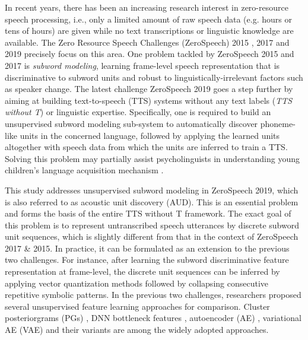 \documentclass[a4paper]{article}
\begin{document}
In recent years, there has been an increasing research interest in zero-resource speech processing, i.e., only a limited amount of  raw speech data (e.g. hours or tens of hours)  are given while no text transcriptions or linguistic knowledge are available. The Zero Resource Speech Challenges (ZeroSpeech)   2015 \cite{versteegh2015zero}, 2017 \cite{dunbar2017zero} and 2019 \cite{zs19} precisely focus on this area. One problem tackled by ZeroSpeech 2015 and 2017 is \textit{subword modeling}, learning frame-level speech representation that is discriminative to subword units and robust to linguistically-irrelevant factors such as speaker change. The latest challenge ZeroSpeech 2019 goes a step further by aiming at building text-to-speech (TTS) systems without any text labels (\textit{TTS without T}) or linguistic expertise. Specifically,  one is required to build an unsupervised subword modeling sub-system to automatically discover phoneme-like units in the concerned language, followed by applying the learned units altogether with speech data from which the units are inferred to train a TTS. Solving this problem may partially assist psycholinguists in understanding young children's language acquisition mechanism \cite{zs19}.


This study addresses unsupervised subword modeling  in ZeroSpeech 2019, which is also referred to as acoustic unit discovery (AUD).
This is an essential problem and forms the basis of the entire TTS without T framework.
The exact goal of this problem  is to represent  untranscribed speech utterances by discrete subword unit sequences, which is slightly different from that in the context of ZeroSpeech 2017 \& 2015.
In practice, it can be formulated as an extension to  the previous two challenges. For instance, after learning the subword discriminative feature representation at frame-level, the discrete unit sequences can be inferred by applying vector quantization methods  followed by collapsing  consecutive repetitive symbolic patterns. 
In the previous two challenges,  researchers proposed several unsupervised feature learning approaches  for comparison. Cluster posteriorgrams (PGs) \cite{chen2015parallel,ansari2017unsupervised,heck2017feature}, DNN bottleneck features \cite{shibata2017composite,chen2017multilingual}, autoencoder (AE) \cite{renshaw2015comparison}, variational AE (VAE) and their variants \cite{Feng2019improving,Chorowski2019unsup} are among the widely adopted approaches.
\end{document}
